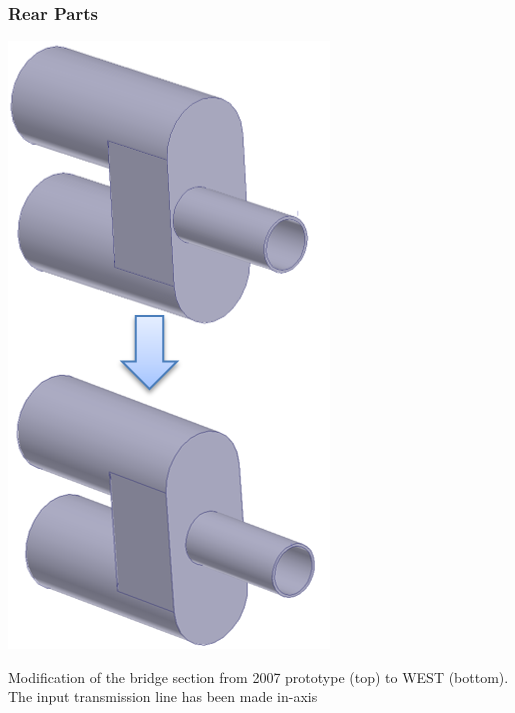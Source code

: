 {\subsubsection{Rear Parts}
\begin{marginfigure}
	\centering
	\includegraphics[width=1.0\linewidth]{figures/chap3/WEST_ICRH/bridge_evolution}
	\caption{Modification of the bridge section from 2007 prototype (top) to WEST (bottom). The input transmission line has been made in-axis}
	\label{fig:bridgeevolution}
\end{marginfigure}

}
